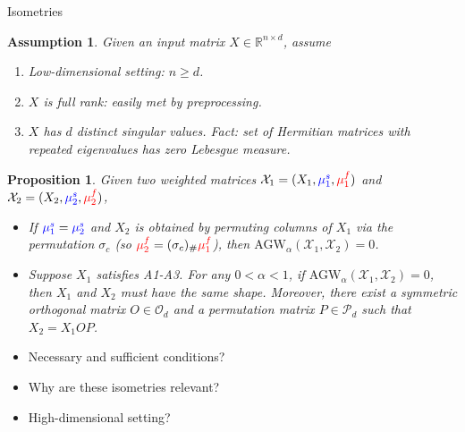 \documentclass{beamer}
\newcommand{\agw}{\text{AGW}}
\newcommand{\cX}{\mathcal X}
\newcommand{\bbR}{\mathbb R}
\newcommand{\mfsrc}{{\color{red}{\mu_1^f}}}
\newcommand{\mftg}{{\color{red}{\mu_2^f}}}
\newcommand{\mssrc}{{\color{blue}{\mu_1^s}}}
\newcommand{\mstg}{{\color{blue}{\mu_2^s}}}
\newtheorem{proposition}{Proposition}[section]
\newtheorem{assumption}{Assumption}
\begin{document}
\begin{frame}{Isometries}
\scriptsize

\begin{assumption}
Given an input matrix $X \in \bbR^{n \times d}$, assume
\begin{enumerate}
  \setlength\itemindent{15pt}
  \item[(A1)] Low-dimensional setting: $n \geq d$.
  \item[(A2)] $X$ is full rank: easily met by preprocessing.
  \item[(A3)] $X$ has $d$ distinct singular values. Fact:
  set of Hermitian matrices with repeated eigenvalues has zero Lebesgue measure.
\end{enumerate}
\end{assumption}
\begin{proposition}
  Given two weighted matrices $\cX_1 = (X_1, \mssrc, \mfsrc)$
  and $\cX_2 = (X_2, \mstg, \mftg)$,
  \begin{itemize}
    \setlength\itemindent{15pt}
    \item[$(\Rightarrow)$] If $\mssrc = \mstg$ and
    $X_2$ is obtained by permuting columns of $X_1$ via
    the permutation $\sigma_c$ (so $\mftg = (\sigma_c)_{\#} \mfsrc$),
    then $\agw_{\alpha}(\cX_1, \cX_2) = 0$.
    \item[$(\Leftarrow)$] Suppose $X_1$ satisfies A1-A3. For any $0 < \alpha < 1$,
    if $\agw_{\alpha}(\cX_1, \cX_2) = 0$, then $X_1$ and $X_2$ must have the same shape.
    Moreover, there exist a symmetric orthogonal matrix $O \in \mathcal O_d$
    and a permutation matrix $P \in \mathcal P_d$ such that $X_2 = X_1 OP$.
  \end{itemize}
\end{proposition}

\begin{minipage}[t]{0.2\linewidth}
\end{minipage}
\hfill%
\begin{minipage}[t]{0.8\linewidth}
  {}
  \begin{itemize}
    \item[$\bullet$] Necessary and sufficient conditions?
    \item[$\bullet$] Why are these isometries relevant?
    \item[$\bullet$] High-dimensional setting?
  \end{itemize}
\end{minipage}%


\end{frame}
\end{document}
